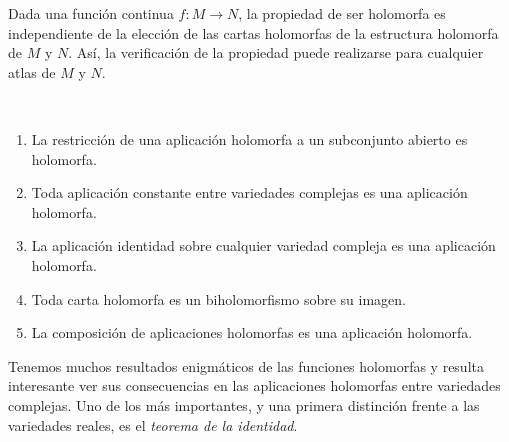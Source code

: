 \begin{remark}
	Dada una función continua $f:M\to N$, la propiedad de ser holomorfa es independiente de la elección de las cartas holomorfas de la estructura holomorfa de $M$ y $N$. Así, la verificación de la propiedad puede realizarse para cualquier atlas de $M$ y $N$.
\end{remark}

\begin{lemma}$ $
	\begin{enumerate}
		\item La restricción de una aplicación holomorfa a un subconjunto abierto es holomorfa.
		\item Toda aplicación constante entre variedades complejas es una aplicación holomorfa.
		\item La aplicación identidad sobre cualquier variedad compleja es una aplicación holomorfa.
		\item Toda carta holomorfa es un biholomorfismo sobre su imagen.
		\item La composición de aplicaciones holomorfas es una aplicación holomorfa.
	\end{enumerate}
\end{lemma}

Tenemos muchos resultados enigmáticos de las funciones holomorfas y resulta interesante ver sus consecuencias en las aplicaciones holomorfas entre variedades complejas. Uno de los más importantes, y una primera distinción frente a las variedades reales, es el \textit{teorema de la identidad}.

